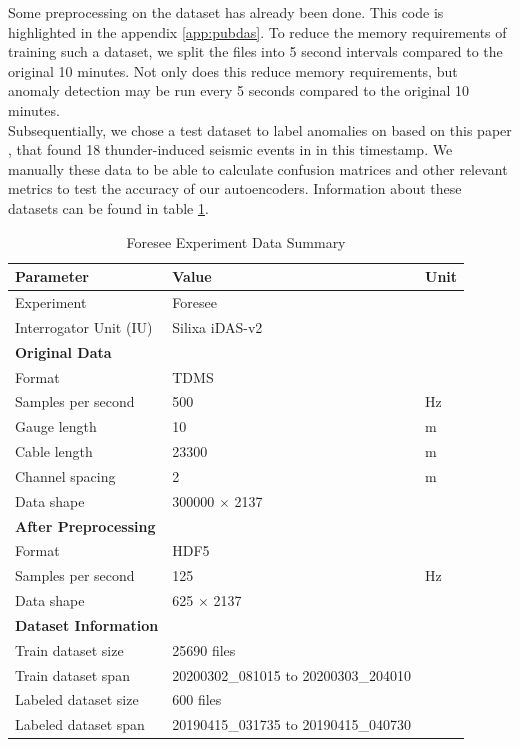 Some preprocessing on the dataset has already been done. This code is highlighted in the appendix \ref{app:pubdas}. To reduce the memory requirements of training such a dataset, we split the files into 5 second intervals compared to the original 10 minutes. Not only does this reduce memory requirements, but anomaly detection may be run every 5 seconds compared to the original 10 minutes. \\

Subsequentially, we chose a test dataset to label anomalies on based on this paper \cite{zhu2023seismic}, that found 18 thunder-induced seismic events in in this timestamp. We manually these data to be able to calculate confusion matrices and other relevant metrics to test the accuracy of our autoencoders. Information about these datasets can be found in table \ref{tab:foresee_experiment_data}. \\

\begin{table}[!htbp]
    \centering
    \small
    \begin{tabular}{@{}p{}p{}p{}@{}}
        \toprule
        \textbf{Parameter} & \textbf{Value} & \textbf{Unit} \\
        \midrule
        Experiment & Foresee & \\
        Interrogator Unit (IU) & Silixa iDAS-v2 & \\
        \midrule
        \textbf{Original Data} & & \\
        Format & TDMS & \\
        Samples per second & 500 & \si{\hertz} \\
        Gauge length & 10 & \si{\meter} \\
        Cable length & 23300 & \si{\meter} \\
        Channel spacing & 2 & \si{\meter} \\
        Data shape & 300000 \(\times\) 2137 & \\
        \midrule
        \textbf{After Preprocessing} & & \\
        Format & HDF5 & \\
        Samples per second & 125 & \si{\hertz} \\
        Data shape & 625 \(\times\) 2137 & \\
        \midrule
        \textbf{Dataset Information} & & \\
        Train dataset size & 25690 files & \\
        Train dataset span & 20200302\_081015 to 20200303\_204010 & \\
        Labeled dataset size & 600 files & \\
        Labeled dataset span & 20190415\_031735 to 20190415\_040730 & \\
        \bottomrule
    \end{tabular}
    \caption{Foresee Experiment Data Summary}
    \label{tab:foresee_experiment_data}
\end{table}

